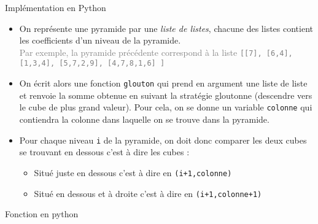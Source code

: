\documentclass[10pt]{beamer}
\begin{document}
\begin{frame}{\Ctitle}{\stitle}
\begin{block}{Implémentation en Python}
	\begin{itemize}
		\item<1-> On représente une pyramide par une \textit{liste de listes}, chacune des listes contient les coefficients d'un niveau de la pyramide.\\
		\textcolor{gray}{\small Par exemple, la pyramide  précédente correspond à la liste \texttt{[[7], [6,4], [1,3,4], [5,7,2,9], [4,7,8,1,6] ]}}
		\item<2-> On écrit alors une fonction {\tt glouton} qui prend en argument une liste de liste et renvoie la somme obtenue en suivant la stratégie gloutonne (descendre vers le cube de plus grand valeur). Pour cela, on se donne un variable {\tt colonne} qui contiendra la colonne dans laquelle on se trouve dans la pyramide.
		\item<3-> Pour chaque niveau {\tt i} de la pyramide, on doit donc comparer les deux cubes se trouvant en dessous c'est à dire les cubes :
		\begin{itemize}
		\item<3-> Situé juste en dessous c'est à dire en {\tt (i+1,colonne)} 
		\item<3-> Situé en dessous et à droite c'est à dire en {\tt (i+1,colonne+1)}
		\end{itemize}
	\end{itemize}
\end{block}
\end{frame}

\begin{frame}{\Ctitle}{\stitle}
	\begin{block}{Fonction en python}
	\end{block}
\end{frame}
\end{document}
